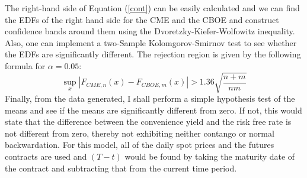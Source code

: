\documentclass{paper}
\let\oldref\ref
\renewcommand{\ref}[1]{(\oldref{#1})}
\begin{document}
\begin{doublespacing}
The right-hand side of Equation \ref{cont} can be easily calculated and we can find the EDFs of the right hand side for the CME and the CBOE and construct confidence bands around them using the Dvoretzky-Kiefer-Wolfowitz inequality. Also, one can implement a two-Sample Kolomgorov-Smirnov test to see whether the EDFs are significantly different. The rejection region is given by the following formula for $\alpha = 0.05$:
$$\sup\limits_{x}\left|F_{CME,n}(x)- F_{CBOE,m}(x)\right| > 1.36\sqrt{\frac{n+m}{nm}}$$
Finally, from the data generated, I shall perform a simple hypothesis test of the means and see if the means are significantly different from zero. If not, this would state that the difference between the convenience yield and the risk free rate is not different from zero, thereby not exhibiting neither contango or normal backwardation. For this model, all of the daily spot prices and the futures contracts are used and $(T-t)$ would be found by taking the maturity date of the contract and subtracting that from the current time period.

\end{doublespacing}
\end{document}
